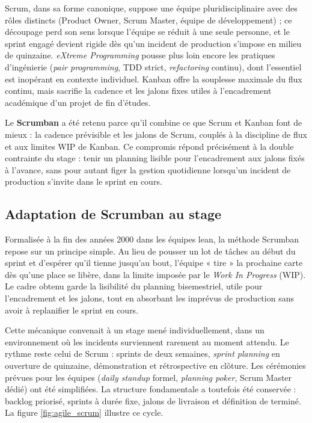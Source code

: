         Scrum, dans sa forme canonique, suppose une équipe pluridisciplinaire avec
        des rôles distincts (Product Owner, Scrum Master, équipe de développement) ;
        ce découpage perd son sens lorsque l'équipe se réduit à une seule personne,
        et le sprint engagé devient rigide dès qu'un incident de production
        s'impose en milieu de quinzaine. \textit{eXtreme Programming} pousse plus
        loin encore les pratiques d'ingénierie (\textit{pair programming}, TDD strict,
        \textit{refactoring} continu), dont l'essentiel est inopérant en contexte individuel.
        Kanban offre la souplesse maximale du flux continu, mais sacrifie la
        cadence et les jalons fixes utiles à l'encadrement académique d'un projet
        de fin d'études.

        Le \textbf{Scrumban} \cite{Ladas2009} a été retenu parce qu'il combine ce
        que Scrum et Kanban font de mieux : la cadence prévisible et les jalons de
        Scrum, couplés à la discipline de flux et aux limites WIP de Kanban. Ce
        compromis répond précisément à la double contrainte du stage : tenir un
        planning lisible pour l'encadrement aux jalons fixés à l'avance, sans pour
        autant figer la gestion quotidienne lorsqu'un incident de production
        s'invite dans le sprint en cours.

    \subsection{Adaptation de Scrumban au stage}

        Formalisée à la fin des années 2000 dans les équipes lean, la méthode
        Scrumban repose sur un principe simple. Au lieu de pousser un lot de tâches
        au début du sprint et d'espérer qu'il tienne jusqu'au bout, l'équipe « tire » la prochaine
        carte dès qu'une place se libère, dans la limite imposée par le
        \textit{Work In Progress} (WIP). Le cadre obtenu garde la lisibilité du
        planning bisemestriel, utile pour l'encadrement et les jalons, tout en
        absorbant les imprévus de production sans avoir à replanifier le sprint
        en cours.

        Cette mécanique convenait à un stage mené individuellement, dans un
        environnement où les incidents surviennent rarement au moment attendu. Le
        rythme reste celui de Scrum \cite{Scrum} : sprints de deux semaines,
        \textit{sprint planning} en ouverture de quinzaine, démonstration et
        rétrospective en clôture. Les cérémonies prévues pour les équipes
        (\textit{daily standup} formel, \textit{planning poker}, Scrum Master dédié)
        ont été simplifiées. La structure fondamentale a toutefois été conservée :
        backlog priorisé, sprints à durée fixe, jalons de livraison et
        définition de terminé. La figure \ref{fig:agile_scrum} illustre ce cycle.

